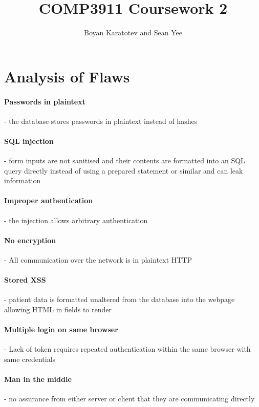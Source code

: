 \documentclass[10pt]{article}
\title{COMP3911 Coursework 2}
\author{Boyan Karatotev and Sean Yee}
\date{}
\begin{document}
    \maketitle

    \section{Analysis of Flaws}

        \paragraph{Passwords in plaintext} - the database stores passwords in
        plaintext instead of hashes

        \paragraph{SQL injection} - form inputs are not sanitised and their
        contents are formatted into an SQL query directly instead of using a
        prepared statement or similar and can leak information

        \paragraph{Improper authentication} - the injection allows arbitrary
        authentication

        \paragraph{No encryption} - All communication over the network is in
        plaintext HTTP

        \paragraph{Stored XSS} - patient data is formatted unaltered from the
        database into the webpage allowing HTML in fields to render

        \paragraph{Multiple login on same browser} - Lack of token requires
        repeated authentication within the same browser with same credentials

        \paragraph{Man in the middle} - no assurance from either server or
        client that they are communicating directly
\end{document}
